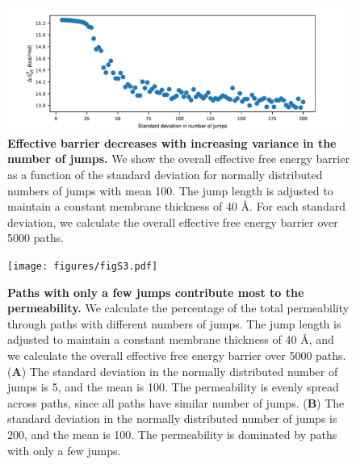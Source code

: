 \clearpage
\pagebreak

\begin{figure}[ht!]
    \centering
    \includegraphics[width=\textwidth]{figures/figS2.pdf}
    \caption{\textbf{Effective barrier decreases with increasing variance in the number of jumps.} We show the overall effective free energy barrier as a function of the standard deviation for normally distributed numbers of jumps with mean 100. The jump length is adjusted to maintain a constant membrane thickness of 40 \AA. For each standard deviation, we calculate the overall effective free energy barrier over 5000 paths.}
    \label{fig:jump_variances}
\end{figure}

\clearpage
\pagebreak

\begin{figure}[ht!]
    \centering
    \texttt{[image: figures/figS3.pdf]}
    \caption{\textbf{Paths with only a few jumps contribute most to the permeability.} We calculate the percentage of the total permeability through paths with different numbers of jumps. The jump length is adjusted to maintain a constant membrane thickness of 40 \AA, and we calculate the overall effective free energy barrier over 5000 paths. (\textbf{A}) The standard deviation in the normally distributed number of jumps is 5, and the mean is 100. The permeability is evenly spread across paths, since all paths have similar number of jumps. (\textbf{B}) The standard deviation in the normally distributed number of jumps is 200, and the mean is 100. The permeability is dominated by paths with only a few jumps.}
    \label{fig:perm_percentage}
\end{figure}

\clearpage
\pagebreak

